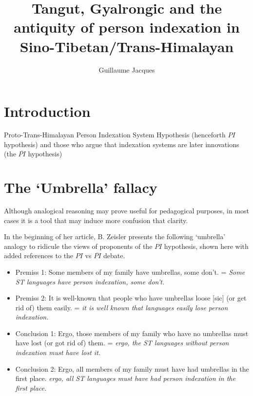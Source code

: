 \documentclass[oldfontcommands,oneside,a4paper,11pt]{article}
\begin{document}
 
\title{Tangut, Gyalrongic and the antiquity of person indexation in Sino-Tibetan/Trans-Himalayan}
\author{Guillaume Jacques}
\maketitle
\linenumbers

\section{Introduction}



\citealt{jacques12internal}

\citet{hill14derivational}

\citealt{zeisler15eat}

\citet{zeisler04}


Proto-Trans-Himalayan Person Indexation System Hypothesis (henceforth $PI$ hypothesis) and those who argue that indexation systems are later innovations (the $\overline{PI}$ hypothesis)


\citet{delancey89agreement}
\citet{lapolla92}


\section{The `Umbrella' fallacy}
Although analogical reasoning may prove useful for pedagogical purposes, in most cases it is a tool that may induce more confusion that clarity.

In the beginning of her article, B. Zeisler presents the following `umbrella' analogy to ridicule the views of proponents of the $PI$ hypothesis, shown here with added references to the $PI$ vs $\overline{PI}$ debate.

\begin{itemize}
\item Premiss 1: Some members of my family have umbrellas, some don’t. = \textit{Some ST languages have person indexation, some don't.}
\item Premiss 2: It is well-known that people who have umbrellas loose [sic] (or get rid of) them easily. = \textit{it is well known that languages easily lose person indexation.}
\item Conclusion 1: Ergo, those members of my family who have no umbrellas must have lost (or got rid of) them. = \textit{ergo, the ST languages without person indexation must have lost it.}
\item Conclusion 2: Ergo, all members of my family must have had umbrellas in the first place. \textit{ergo, all ST languages must have had person indexation in the first place.}
\end{itemize}
\end{document}
